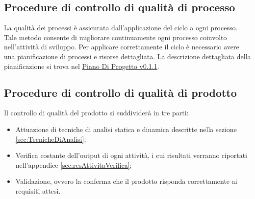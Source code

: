 \documentclass{scalatekids-article}
\begin{document}
\subsection{Procedure di controllo di qualità di processo}
La qualità dei processi è assicurata dall'applicazione del ciclo  a ogni processo. Tale metodo consente di migliorare continuamente ogni processo coinvolto nell’attività di sviluppo. Per applicare correttamente il ciclo  è necessario avere una pianificazione di processi e risorse dettagliata. La descrizione dettagliata della pianificazione si trova nel \href{run:./PianoDiProgetto\_v0.1.1.pdf}{Piano Di Progetto v0.1.1}.\\
\subsection{Procedure di controllo di qualità di prodotto}
Il controllo di qualità del prodotto si suddividerà in tre parti:
\begin{itemize}
\item{Attuazione di tecniche di analisi statica e dinamica descritte nella sezione \ref{sec:TecnicheDiAnalisi};}
\item{Verifica costante dell'output di ogni attività, i cui risultati verranno riportati nell'appendice \ref{sec:resAttivitaVerifica};}
\item{Validazione, ovvero la conferma che il prodotto risponda correttamente ai requisiti attesi.}
\end{itemize}
\end{document}
